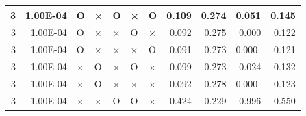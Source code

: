 \documentclass[11pt]{article}
\begin{document}
\begin{longtable}[h]{|r|r|l|l|l|l|l|r|r|l|r|}
3                                 & 1.00E-04                         & O                                & ×                                & O                                & ×                                & O                                 & 0.109                             & 0.274                             & \multicolumn{1}{r|}{0.051}         & 0.145                               \\ \hline
3                                 & 1.00E-04                         & O                                & ×                                & ×                                & O                                & ×                                 & 0.092                             & 0.275                             & \multicolumn{1}{r|}{0.000}         & 0.122                               \\ \hline
3                                 & 1.00E-04                         & O                                & ×                                & ×                                & ×                                & O                                 & 0.091                             & 0.273                             & 0.000                              & 0.121                               \\ \hline
3                                 & 1.00E-04                         & ×                                & O                                & ×                                & O                                & ×                                 & 0.099                             & 0.273                             & \multicolumn{1}{r|}{0.024}         & 0.132                               \\ \hline
3                                 & 1.00E-04                         & ×                                & O                                & ×                                & ×                                & ×                                 & 0.092                             & 0.278                             & 0.000                              & 0.123                               \\ \hline
3                                 & 1.00E-04                         & ×                                & ×                                & O                                & O                                & ×                                 & 0.424                             & 0.229                             & \multicolumn{1}{r|}{0.996}         & 0.550                               \\ \hline

\end{longtable}
\end{document}
